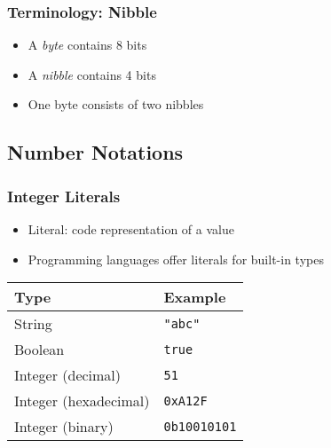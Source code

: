 \begin{frame}
  \frametitle{Terminology: Nibble}
  \begin{itemize}
    \item A \emph{byte} contains 8 bits
    \item A \emph{nibble} contains 4 bits
    \item One byte consists of two nibbles
  \end{itemize}
  \vskip4mm
  \begin{center}
  \end{center}
\end{frame}




\subsection{Number Notations}
\frame{\tableofcontents[currentsubsection]}

\begin{frame}
  \frametitle{Integer Literals}
  \begin{itemize}
    \item Literal: code representation of a value
    \item Programming languages offer literals for built-in types
  \end{itemize}
  \vskip4mm
  \begin{center}
    \begin{tabular}{ll}
      \toprule
      \textbf{Type} & \textbf{Example} \\
      \midrule
      String & \texttt{"abc"} \\
      Boolean & \texttt{true} \\
      Integer (decimal) & \texttt{51} \\
      Integer (hexadecimal) & \texttt{0xA12F} \\
      Integer (binary) & \texttt{0b10010101} \\
      \bottomrule
    \end{tabular}
  \end{center}
\end{frame}

